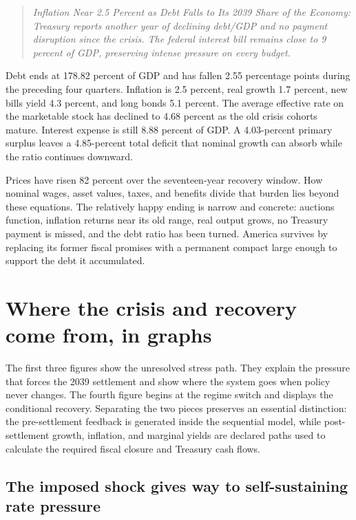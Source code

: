 \documentclass[11pt]{article}
\begin{document}
\begin{quote}
\small\itshape
Inflation Near 2.5 Percent as Debt Falls to Its 2039 Share of the Economy: Treasury reports
another year of declining debt/GDP and no payment disruption since the crisis.  The federal
interest bill remains close to 9 percent of GDP, preserving intense pressure on every budget.
\end{quote}

Debt ends at 178.82 percent of GDP and has fallen 2.55 percentage points during the preceding
four quarters.  Inflation is 2.5 percent, real growth 1.7 percent, new bills yield 4.3
percent, and long bonds 5.1 percent.  The average effective rate on the marketable stock has
declined to 4.68 percent as the old crisis cohorts mature.  Interest expense is still 8.88
percent of GDP.  A 4.03-percent primary surplus leaves a 4.85-percent total deficit that
nominal growth can absorb while the ratio continues downward.

Prices have risen 82 percent over the seventeen-year recovery window.  How nominal wages,
asset values, taxes, and benefits divide that burden lies beyond these equations.  The
relatively happy ending is narrow and concrete: auctions function, inflation returns near
its old range, real output grows, no Treasury payment is missed, and the debt ratio has been
turned.  America survives by replacing its former fiscal promises with a permanent compact
large enough to support the debt it accumulated.

\section{Where the crisis and recovery come from, in graphs}

The first three figures show the unresolved stress path.  They explain the pressure that
forces the 2039 settlement and show where the system goes when policy never changes.  The
fourth figure begins at the regime switch and displays the conditional recovery.  Separating
the two pieces preserves an essential distinction: the pre-settlement feedback is generated
inside the sequential model, while post-settlement growth, inflation, and marginal yields
are declared paths used to calculate the required fiscal closure and Treasury cash flows.

\subsection*{The imposed shock gives way to self-sustaining rate pressure}
\end{document}
